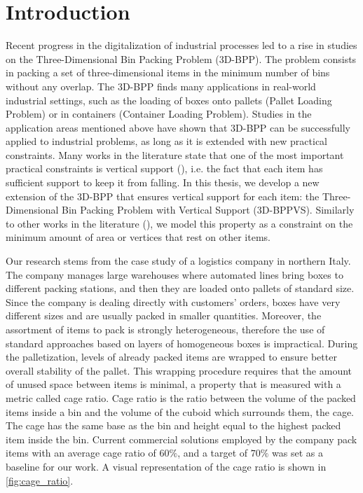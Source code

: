 \documentclass[11pt,a4paper,twocolumn]{article}
\begin{document}
\section{Introduction}
\label{sec:introduction}

Recent progress in the digitalization of industrial processes led to a rise in studies on the Three-Dimensional Bin Packing Problem (3D-BPP).
The problem consists in packing a set of three-dimensional items in the minimum number of bins without any overlap.
The 3D-BPP finds many applications in real-world industrial settings, such as the loading of boxes onto pallets (Pallet Loading Problem) or in containers (Container Loading Problem). 
Studies in the application areas mentioned above have shown that 3D-BPP can be successfully applied to industrial problems, as long as it is extended with new practical constraints. 
Many works in the literature state that one of the most important practical constraints is vertical support (\cite{BORTFELDT20131}), i.e. the fact that each item has sufficient support to keep it from falling.
In this thesis, we develop a new extension of the 3D-BPP that ensures vertical support for each item: the Three-Dimensional Bin Packing Problem with Vertical Support (3D-BPPVS).
Similarly to other works in the literature (\cite{GZARA20201062,paquay2016mixed}), we model this property as a constraint on the minimum amount of area or vertices that rest on other items.

Our research stems from the case study of a logistics company in northern Italy.
The company manages large warehouses where automated lines bring boxes to different packing stations, and then they are loaded onto pallets of standard size.
Since the company is dealing directly with customers' orders, boxes have very different sizes and are usually packed in smaller quantities.
Moreover, the assortment of items to pack is strongly heterogeneous, therefore the use of standard approaches based on layers of homogeneous boxes is impractical.
During the palletization, levels of already packed items are wrapped to ensure better overall stability of the pallet.
This wrapping procedure requires that the amount of unused space between items is minimal, a property that is measured with a metric called cage ratio.
Cage ratio is the ratio between the volume of the packed items inside a bin and the volume of the cuboid which surrounds them, the cage.
The cage has the same base as the bin and height equal to the highest packed item inside the bin.
Current commercial solutions employed by the company pack items with an average cage ratio of $60\%$, and a target of $70\%$ was set as a baseline for our work.
A visual representation of the cage ratio is shown in \cref{fig:cage_ratio}.
\end{document}

